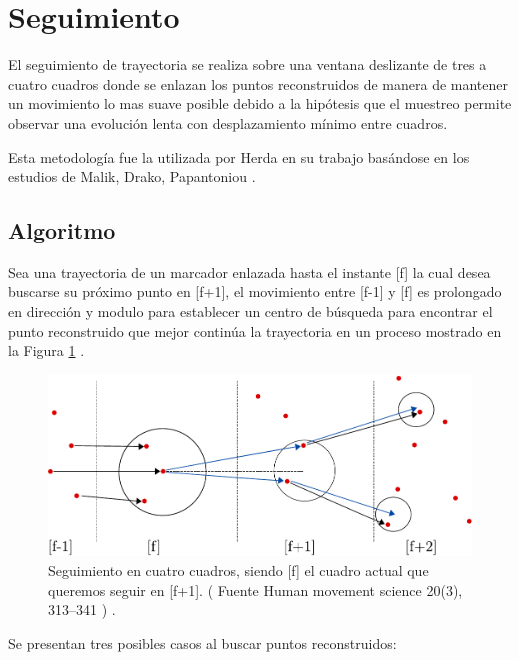 \section{Seguimiento}

El seguimiento de trayectoria se realiza sobre una ventana deslizante de tres a cuatro cuadros donde se enlazan los puntos reconstruidos de manera de mantener un movimiento lo mas suave posible debido a la hipótesis que el muestreo permite observar una evolución lenta con desplazamiento mínimo entre cuadros.

Esta metodología fue la utilizada por Herda \cite{herda} en su trabajo basándose en los estudios de Malik, Drako, Papantoniou \cite{griegos} .

\subsection{Algoritmo}

Sea una trayectoria de un marcador enlazada hasta el instante [f] la cual desea buscarse su próximo punto en [f+1], el movimiento entre [f-1] y [f] es prolongado en dirección y modulo para establecer un centro de búsqueda para encontrar el punto reconstruido que mejor continúa la trayectoria en un proceso mostrado en la Figura \ref{herda_00} .

\begin{figure}[ht!]
\begin{center}
\includegraphics[scale=0.4]{imagenes/Seguimiento/tracking-eps-converted-to.pdf}
\end{center}
\caption{Seguimiento en cuatro cuadros, siendo [f] el cuadro actual que queremos seguir en [f+1]. ( Fuente  Human movement
science 20(3), 313–341 \cite{herda} ) .}
\label{herda_00}
\end{figure}

Se presentan tres posibles casos al buscar puntos reconstruidos:

